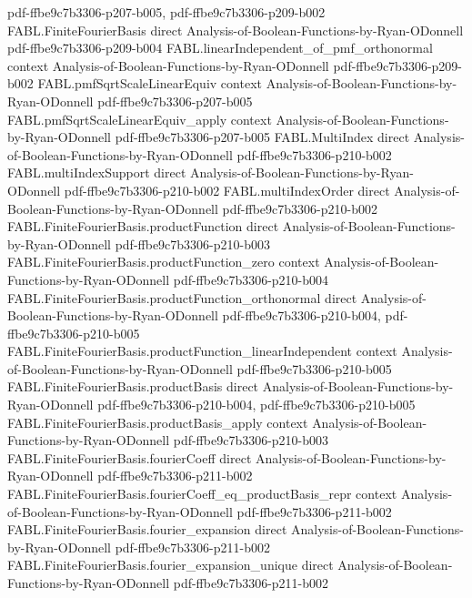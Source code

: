 \begin{theorem}
  {pdf-ffbe9c7b3306-p207-b005,
    pdf-ffbe9c7b3306-p209-b002}
\proofstep
  {FABL.FiniteFourierBasis}
  {direct}
  {Analysis-of-Boolean-Functions-by-Ryan-ODonnell}
  {pdf-ffbe9c7b3306-p209-b004}
\proofstep
  {FABL.linearIndependent_of_pmf_orthonormal}
  {context}
  {Analysis-of-Boolean-Functions-by-Ryan-ODonnell}
  {pdf-ffbe9c7b3306-p209-b002}
\proofstep
  {FABL.pmfSqrtScaleLinearEquiv}
  {context}
  {Analysis-of-Boolean-Functions-by-Ryan-ODonnell}
  {pdf-ffbe9c7b3306-p207-b005}
\proofstep
  {FABL.pmfSqrtScaleLinearEquiv_apply}
  {context}
  {Analysis-of-Boolean-Functions-by-Ryan-ODonnell}
  {pdf-ffbe9c7b3306-p207-b005}
\proofstep
  {FABL.MultiIndex}
  {direct}
  {Analysis-of-Boolean-Functions-by-Ryan-ODonnell}
  {pdf-ffbe9c7b3306-p210-b002}
\proofstep
  {FABL.multiIndexSupport}
  {direct}
  {Analysis-of-Boolean-Functions-by-Ryan-ODonnell}
  {pdf-ffbe9c7b3306-p210-b002}
\proofstep
  {FABL.multiIndexOrder}
  {direct}
  {Analysis-of-Boolean-Functions-by-Ryan-ODonnell}
  {pdf-ffbe9c7b3306-p210-b002}
\proofstep
  {FABL.FiniteFourierBasis.productFunction}
  {direct}
  {Analysis-of-Boolean-Functions-by-Ryan-ODonnell}
  {pdf-ffbe9c7b3306-p210-b003}
\proofstep
  {FABL.FiniteFourierBasis.productFunction_zero}
  {context}
  {Analysis-of-Boolean-Functions-by-Ryan-ODonnell}
  {pdf-ffbe9c7b3306-p210-b004}
\proofstep
  {FABL.FiniteFourierBasis.productFunction_orthonormal}
  {direct}
  {Analysis-of-Boolean-Functions-by-Ryan-ODonnell}
  {pdf-ffbe9c7b3306-p210-b004,
    pdf-ffbe9c7b3306-p210-b005}
\proofstep
  {FABL.FiniteFourierBasis.productFunction_linearIndependent}
  {context}
  {Analysis-of-Boolean-Functions-by-Ryan-ODonnell}
  {pdf-ffbe9c7b3306-p210-b005}
\proofstep
  {FABL.FiniteFourierBasis.productBasis}
  {direct}
  {Analysis-of-Boolean-Functions-by-Ryan-ODonnell}
  {pdf-ffbe9c7b3306-p210-b004,
    pdf-ffbe9c7b3306-p210-b005}
\proofstep
  {FABL.FiniteFourierBasis.productBasis_apply}
  {context}
  {Analysis-of-Boolean-Functions-by-Ryan-ODonnell}
  {pdf-ffbe9c7b3306-p210-b003}
\proofstep
  {FABL.FiniteFourierBasis.fourierCoeff}
  {direct}
  {Analysis-of-Boolean-Functions-by-Ryan-ODonnell}
  {pdf-ffbe9c7b3306-p211-b002}
\proofstep
  {FABL.FiniteFourierBasis.fourierCoeff_eq_productBasis_repr}
  {context}
  {Analysis-of-Boolean-Functions-by-Ryan-ODonnell}
  {pdf-ffbe9c7b3306-p211-b002}
\proofstep
  {FABL.FiniteFourierBasis.fourier_expansion}
  {direct}
  {Analysis-of-Boolean-Functions-by-Ryan-ODonnell}
  {pdf-ffbe9c7b3306-p211-b002}
\proofstep
  {FABL.FiniteFourierBasis.fourier_expansion_unique}
  {direct}
  {Analysis-of-Boolean-Functions-by-Ryan-ODonnell}
  {pdf-ffbe9c7b3306-p211-b002}

\end{theorem}
